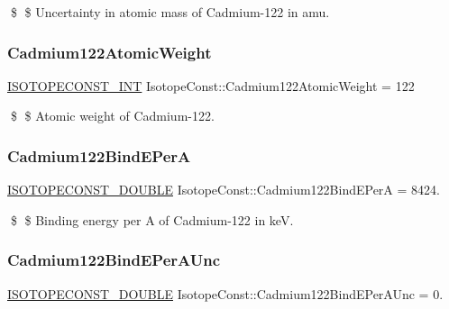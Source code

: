 \$ \$ Uncertainty in atomic mass of Cadmium-\/122 in amu. \mbox{\label{group___isotope_const-_cadmium-_cd122_gadd9747ca7580f75c1c367fb6398ee433}} 
\subsubsection{\texorpdfstring{Cadmium122\+Atomic\+Weight}{Cadmium122AtomicWeight}}
{\footnotesize\ttfamily \mbox{\hyperlink{group___isotope_const-_macros_ga5f18360b3e99483a35c32d789e62621c}{I\+S\+O\+T\+O\+P\+E\+C\+O\+N\+S\+T\+\_\+\+I\+NT}} Isotope\+Const\+::\+Cadmium122\+Atomic\+Weight = 122}

\$ \$ Atomic weight of Cadmium-\/122. \mbox{\label{group___isotope_const-_cadmium-_cd122_gab3ee3c5a7c3d8550bbe183aa4905fcee}} 
\subsubsection{\texorpdfstring{Cadmium122\+Bind\+E\+PerA}{Cadmium122BindEPerA}}
{\footnotesize\ttfamily \mbox{\hyperlink{group___isotope_const-_macros_ga8f45a7272ce02c0b4c65c44636ed719a}{I\+S\+O\+T\+O\+P\+E\+C\+O\+N\+S\+T\+\_\+\+D\+O\+U\+B\+LE}} Isotope\+Const\+::\+Cadmium122\+Bind\+E\+PerA = 8424.}

\$ \$ Binding energy per A of Cadmium-\/122 in keV. \mbox{\label{group___isotope_const-_cadmium-_cd122_ga642a5422a47f619fcf5955e1292f2bb3}} 
\subsubsection{\texorpdfstring{Cadmium122\+Bind\+E\+Per\+A\+Unc}{Cadmium122BindEPerAUnc}}
{\footnotesize\ttfamily \mbox{\hyperlink{group___isotope_const-_macros_ga8f45a7272ce02c0b4c65c44636ed719a}{I\+S\+O\+T\+O\+P\+E\+C\+O\+N\+S\+T\+\_\+\+D\+O\+U\+B\+LE}} Isotope\+Const\+::\+Cadmium122\+Bind\+E\+Per\+A\+Unc = 0.}


